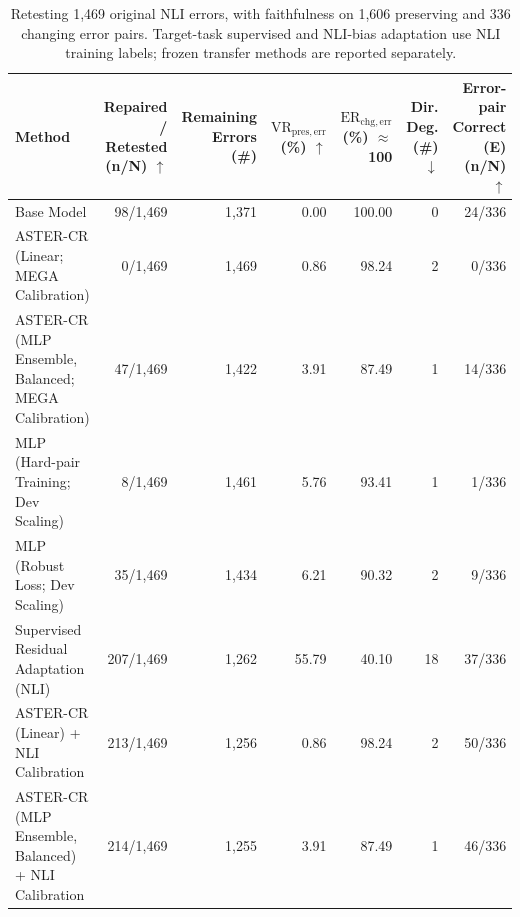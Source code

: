 \begin{table}[t]
\centering
\small
\setlength{\tabcolsep}{3pt}
\begin{tabularx}{\textwidth}{@{}>{\raggedright\arraybackslash}Xrrrrrr@{}}
\toprule
Method & \shortstack{Repaired / Retested\\ (n/N) $\uparrow$} & \shortstack{Remaining Errors\\ (\#)} & \shortstack{$\mathrm{VR}_{\mathrm{pres,err}}$\\ (\%) $\uparrow$} & \shortstack{$\mathrm{ER}_{\mathrm{chg,err}}$\\ (\%) $\approx$100} & \shortstack{Dir. Deg.\\ (\#) $\downarrow$} & \shortstack{Error-pair Correct\\ (E) (n/N) $\uparrow$} \\
\midrule
Base Model & 98/1,469 & 1,371 & 0.00 & 100.00 & 0 & 24/336 \\
ASTER-CR (Linear; MEGA Calibration) & 0/1,469 & 1,469 & 0.86 & 98.24 & 2 & 0/336 \\
ASTER-CR (MLP Ensemble, Balanced; MEGA Calibration) & 47/1,469 & 1,422 & 3.91 & 87.49 & 1 & 14/336 \\
MLP (Hard-pair Training; Dev Scaling) & 8/1,469 & 1,461 & 5.76 & 93.41 & 1 & 1/336 \\
MLP (Robust Loss; Dev Scaling) & 35/1,469 & 1,434 & 6.21 & 90.32 & 2 & 9/336 \\
Supervised Residual Adaptation (NLI) & 207/1,469 & 1,262 & 55.79 & 40.10 & 18 & 37/336 \\
ASTER-CR (Linear) + NLI Calibration & 213/1,469 & 1,256 & 0.86 & 98.24 & 2 & 50/336 \\
ASTER-CR (MLP Ensemble, Balanced) + NLI Calibration & 214/1,469 & 1,255 & 3.91 & 87.49 & 1 & 46/336 \\
\bottomrule
\end{tabularx}
\caption{Retesting 1,469 original NLI errors, with faithfulness on 1,606 preserving and 336 changing error pairs. Target-task supervised and NLI-bias adaptation use NLI training labels; frozen transfer methods are reported separately.}
\label{tab:aster-main-08}
\end{table}

